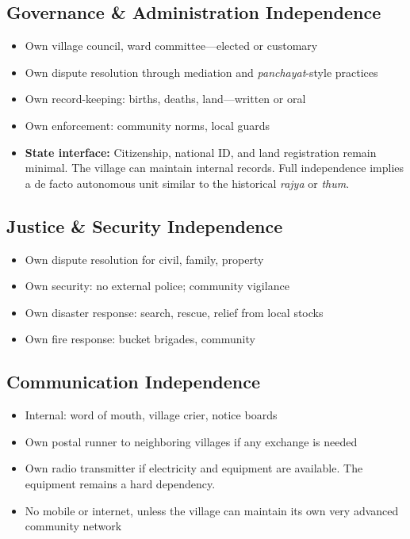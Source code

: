 \documentclass[11pt,a4paper]{article}
\begin{document}
\subsection{Governance \& Administration Independence}
\begin{itemize}
    \item Own village council, ward committee---elected or customary
    \item Own dispute resolution through mediation and \textit{panchayat}-style practices
    \item Own record-keeping: births, deaths, land---written or oral
    \item Own enforcement: community norms, local guards
    \item \textbf{State interface:} Citizenship, national ID, and land registration remain minimal. The village can 
    maintain internal records. Full independence implies a de facto autonomous unit similar to the historical \textit{rajya} or \textit{thum}.
\end{itemize}

\subsection{Justice \& Security Independence}
\begin{itemize}
    \item Own dispute resolution for civil, family, property
    \item Own security: no external police; community vigilance
    \item Own disaster response: search, rescue, relief from local stocks
    \item Own fire response: bucket brigades, community
\end{itemize}

\subsection{Communication Independence}
\begin{itemize}
    \item Internal: word of mouth, village crier, notice boards
    \item Own postal runner to neighboring villages if any exchange is needed
    \item Own radio transmitter if electricity and equipment are available. The equipment remains a hard dependency.
    \item No mobile or internet, unless the village can maintain its own very advanced community network
\end{itemize}
\end{document}
